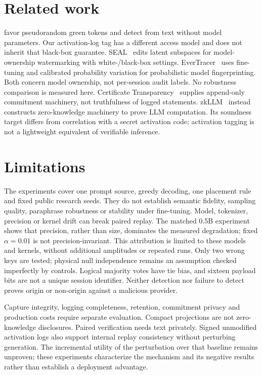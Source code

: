 \documentclass[11pt]{article}
\begin{document}
\section{Related work}
\citet{kirchenbauer2023} favor pseudorandom green tokens and detect from text without
model parameters. Our activation-log tag has a different access model and does
not inherit that black-box guarantee. SEAL~\citep{seal2025} edits latent subspaces
for model-ownership watermarking with white-/black-box settings.
EverTracer~\citep{evertracer2025} uses fine-tuning and calibrated probability
variation for probabilistic model fingerprinting. Both concern model ownership,
not per-session audit labels. No robustness comparison is measured here.
Certificate Transparency~\citep{rfc6962} supplies append-only commitment machinery,
not truthfulness of logged statements. zkLLM~\citep{zkllm2024} instead constructs
zero-knowledge machinery to prove LLM computation. Its soundness target differs
from correlation with a secret activation code; activation tagging is not a
lightweight equivalent of verifiable inference.

\section{Limitations}
The experiments cover one prompt source, greedy decoding, one placement rule and
fixed public research seeds. They do not establish semantic fidelity, sampling
quality, paraphrase robustness or stability under fine-tuning. Model, tokenizer,
precision or kernel drift can break paired replay. The matched 0.5B experiment
shows that precision, rather than size, dominates the measured degradation; fixed
$\alpha=0.01$ is not precision-invariant. This attribution is limited to these
models and kernels, without additional amplitudes or repeated runs.
Only two wrong keys are tested;
physical null independence remains an assumption checked imperfectly by controls.
Logical majority votes have tie bias, and sixteen payload bits are not a unique
session identifier. Neither detection nor failure to detect proves origin or
non-origin against a malicious provider.

Capture integrity, logging completeness, retention, commitment privacy and
production costs require separate evaluation. Compact projections are not
zero-knowledge disclosures. Paired verification needs text privately. Signed
unmodified activation logs also support internal replay consistency without
perturbing generation. The incremental utility of the perturbation over that
baseline remains unproven; these experiments characterize the mechanism and its
negative results rather than establish a deployment advantage.
\end{document}
